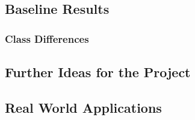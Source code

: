 \subsection{Baseline Results}\label{subsec:baseline-results}
\subsubsection{Class Differences}\label{subsubsec:class-differences}
\subsection{Further Ideas for the Project}\label{subsec:further-ideas}
\subsection{Real World Applications}\label{subsec:real-world-applications}
